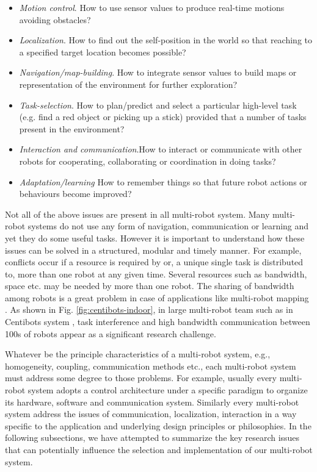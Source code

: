 \begin{itemize}
\item {\em Motion control}. How to use sensor values to produce real-time motions avoiding obstacles?
\item {\em Localization}. How to find out the self-position in the world so that reaching to a specified target location becomes possible?
\item {\em Navigation/map-building}. How to integrate sensor values to build maps or representation of the environment for further exploration?
\item {\em Task-selection}. How to plan/predict and select a particular high-level task (e.g. find a red object or picking up a stick) provided that a number of tasks present in the environment? 
\item {\em Interaction and communication}.How to interact or communicate with other robots for cooperating, collaborating or coordination in doing tasks?
\item {\em Adaptation/learning} How to remember things so that future robot actions or behaviours become improved?
\end{itemize}
Not all of the above issues are present in all multi-robot system. Many multi-robot systems do not use any form of navigation, communication or learning and yet they do some useful tasks. However it is important to understand how these issues can be solved in a structured, modular and timely manner. For example, conflicts occur if a resource is required by or, a unique single task is distributed to, more than one robot at any given time. Several resources such as bandwidth, space etc. may be needed by more than one robot. The sharing of bandwidth among robots is a great problem in case of applications like multi-robot mapping \cite{Konolige+2003}. As shown in Fig. \ref{fig:centibots-indoor}, in large multi-robot team such as in Centibots system \cite{Ortiz+2005}, task interference and high bandwidth communication between 100s of robots appear as a significant research challenge.

Whatever be the principle characteristics of a multi-robot system, e.g., homogeneity, coupling, communication methods etc., each multi-robot system must address some degree to those problems. For example, usually every multi-robot system adopts a control architecture under a specific paradigm to organize its hardware, software and communication system. Similarly every multi-robot system address the issues of communication, localization, interaction in a way specific to the application and underlying design principles or philosophies. In the following subsections, we have attempted to summarize the key research issues that can potentially influence the selection and implementation of our multi-robot system.
